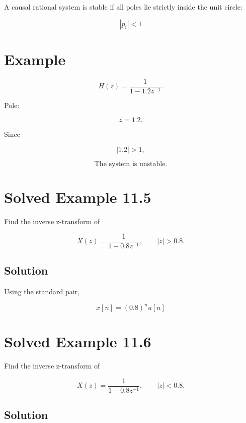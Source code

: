 A causal rational system is stable if all poles lie strictly inside the unit circle:

\[
\boxed{
|p_i|<1
}
\]


\section{Example}

\[
H(z)=
\frac{1}{1-1.2z^{-1}}.
\]

Pole:

\[
z=1.2.
\]

Since

\[
|1.2|>1,
\]

\[
\boxed{
\text{The system is unstable.}
}
\]


\section{Solved Example 11.5}

Find the inverse z-transform of

\[
X(z)=
\frac{1}{1-0.8z^{-1}},
\qquad |z|>0.8.
\]


\subsection{Solution}

Using the standard pair,

\[
\boxed{
x[n]=(0.8)^n u[n]
}
\]


\section{Solved Example 11.6}

Find the inverse z-transform of

\[
X(z)=
\frac{1}{1-0.8z^{-1}},
\qquad |z|<0.8.
\]


\subsection{Solution}

